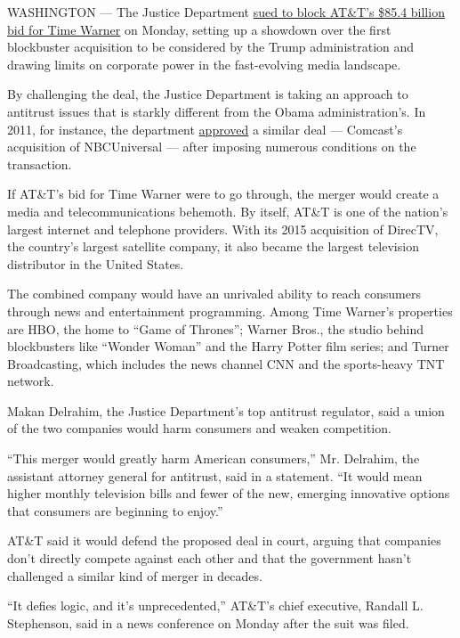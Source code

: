 WASHINGTON --- The Justice Department
\href{https://www.nytimes3xbfgragh.onion/interactive/2017/11/20/business/dealbook/att-time-warner-lawsuit.html}{sued
to block AT\&T's \$85.4 billion bid for Time Warner} on Monday, setting
up a showdown over the first blockbuster acquisition to be considered by
the Trump administration and drawing limits on corporate power in the
fast-evolving media landscape.

By challenging the deal, the Justice Department is taking an approach to
antitrust issues that is starkly different from the Obama
administration's. In 2011, for instance, the department
\href{http://www.nytimes3xbfgragh.onion/2011/01/19/business/media/19comcast.html}{approved}
a similar deal --- Comcast's acquisition of NBCUniversal --- after
imposing numerous conditions on the transaction.

If AT\&T's bid for Time Warner were to go through, the merger would
create a media and telecommunications behemoth. By itself, AT\&T is one
of the nation's largest internet and telephone providers. With its 2015
acquisition of DirecTV, the country's largest satellite company, it also
became the largest television distributor in the United States.

The combined company would have an unrivaled ability to reach consumers
through news and entertainment programming. Among Time Warner's
properties are HBO, the home to ``Game of Thrones''; Warner Bros., the
studio behind blockbusters like ``Wonder Woman'' and the Harry Potter
film series; and Turner Broadcasting, which includes the news channel
CNN and the sports-heavy TNT network.

Makan Delrahim, the Justice Department's top antitrust regulator, said a
union of the two companies would harm consumers and weaken competition.

``This merger would greatly harm American consumers,'' Mr. Delrahim, the
assistant attorney general for antitrust, said in a statement. ``It
would mean higher monthly television bills and fewer of the new,
emerging innovative options that consumers are beginning to enjoy.''

AT\&T said it would defend the proposed deal in court, arguing that
companies don't directly compete against each other and that the
government hasn't challenged a similar kind of merger in decades.

``It defies logic, and it's unprecedented,'' AT\&T's chief executive,
Randall L. Stephenson, said in a news conference on Monday after the
suit was filed.

